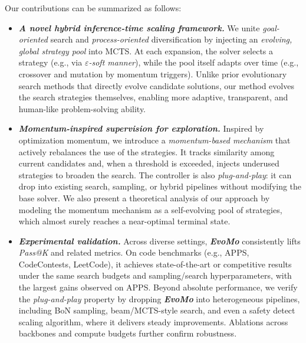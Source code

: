 \documentclass{article} %
\theoremstyle{definition}
\theoremstyle{remark}
\begin{document}
 


Our contributions can be summarized as follows:
\vspace{-0.7em}

\begin{itemize}[leftmargin=*,itemsep=-0.3em]

\item[\ding{72}] \textbf{\textit{A novel hybrid inference-time scaling framework.}}
We unite \textit{goal-oriented} search and \textit{process-oriented} diversification by injecting an \textit{evolving, global strategy pool} into MCTS. At each expansion, the solver selects a strategy (e.g., via \textit{$\varepsilon$-soft manner}), while the pool itself adapts over time (e.g., crossover and mutation by momentum triggers). Unlike prior evolutionary search methods that directly evolve candidate solutions, our method evolves the search strategies themselves, enabling more adaptive, transparent, and human-like problem-solving ability.


\vspace{0.3em}
\item[\ding{72}] \textbf{\textit{Momentum-inspired supervision for exploration.}} Inspired by optimization momentum, we introduce a \textit{momentum-based mechanism} that actively rebalances the use of the strategies. It tracks similarity among current candidates and, when a threshold is exceeded, injects underused strategies to broaden the search. The controller is also \textit{plug-and-play}: it can drop into existing search, sampling, or hybrid pipelines without modifying the base solver. We also present a theoretical analysis of our approach by modeling the momentum mechanism as a self-evolving pool of strategies, which almost surely reaches a near-optimal terminal state. 


\vspace{0.3em}
\item[\ding{72}] \textbf{\textit{Experimental validation.}}
Across diverse settings, \textbf{\textit{EvoMo}} consistently lifts \emph{Pass@K} and related metrics. On code benchmarks (e.g., APPS, CodeContests, LeetCode), it achieves state-of-the-art or competitive results under the same search budgets and sampling/search hyperparameters, with the largest gains observed on APPS. Beyond absolute performance, we verify the \emph{plug-and-play} property by dropping \textbf{\textit{EvoMo}} into heterogeneous pipelines, including BoN sampling, beam/MCTS-style search, and even a safety detect scaling algorithm, where it delivers steady improvements. Ablations across backbones and compute budgets further confirm robustness.

\end{itemize}
\vspace{-0.5em}
\end{document}
